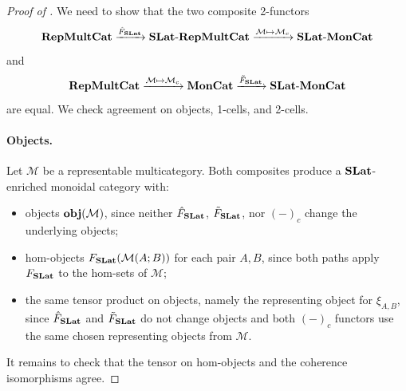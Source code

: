 \begin{proof}[Proof of ]
    We need to show that the two composite 2-functors
    \[
    \mathbf{RepMultCat} \xrightarrow{\hat{F}_{\mathbf{SLat}}} \mathbf{SLat}\text{-}\mathbf{RepMultCat} \xrightarrow{\mathcal{M} \mapsto \mathcal{M}_c} \mathbf{SLat}\text{-}\mathbf{MonCat}
    \]
    and
    \[
    \mathbf{RepMultCat} \xrightarrow{\mathcal{M} \mapsto \mathcal{M}_c} \mathbf{MonCat} \xrightarrow{\tilde{F}_{\mathbf{SLat}}} \mathbf{SLat}\text{-}\mathbf{MonCat}
    \]
    are equal. We check agreement on objects, 1-cells, and 2-cells.

    \paragraph{Objects.} Let $\mathcal{M}$ be a representable multicategory. Both composites produce a $\mathbf{SLat}$-enriched monoidal category with:
    \begin{itemize}
        \item objects ${\mathbf{obj}(\mathcal{M})}$, since neither $\hat{F}_{\mathbf{SLat}}$, $\tilde{F}_{\mathbf{SLat}}$, nor $(-)_c$ change the underlying objects;
        \item hom-objects $F_{\mathbf{SLat}}(\mathcal{M}(A;B))$ for each pair $A,B$, since both paths apply $F_{\mathbf{SLat}}$ to the hom-sets of $\mathcal{M}$;
        \item the same tensor product on objects, namely the representing object for $\xi_{A,B}$, since $\hat{F}_{\mathbf{SLat}}$ and $\tilde{F}_{\mathbf{SLat}}$ do not change objects and both $(-)_c$ functors use the same chosen representing objects from $\mathcal{M}$.
    \end{itemize}
    It remains to check that the tensor on hom-objects and the coherence isomorphisms agree.


\end{proof}

